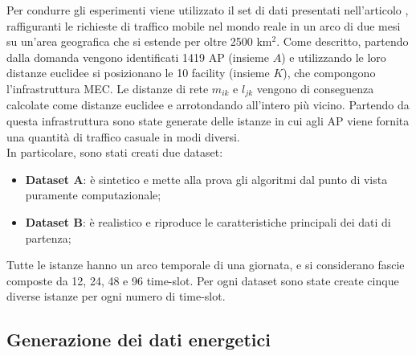 Per condurre gli esperimenti viene utilizzato il set di dati presentati nell'articolo \cite{assignment-patterns}, raffiguranti le richieste di traffico mobile nel mondo reale in un arco di due mesi su un'area geografica che si estende per oltre 2500 km$^2$. Come descritto, partendo dalla domanda vengono identificati 1419 AP (insieme $A$) e utilizzando le loro distanze euclidee si posizionano le 10 facility (insieme $K$), che compongono l'infrastruttura MEC. Le distanze di rete $m_{ik}$ e $l_{jk}$ vengono di conseguenza calcolate come distanze euclidee e arrotondando all'intero più vicino. Partendo da questa infrastruttura sono state generate delle istanze in cui agli AP viene fornita una quantità di traffico casuale in modi diversi.\\
In particolare, sono stati creati due dataset:
\begin{itemize}
    \item \textbf{Dataset A}: è sintetico e mette alla prova gli algoritmi dal punto di vista puramente computazionale;
    \item \textbf{Dataset B}: è realistico e riproduce le caratteristiche principali dei dati di partenza;
\end{itemize}
Tutte le istanze hanno un arco temporale di una giornata, e si considerano fascie composte da 12, 24, 48 e 96 time-slot. Per ogni dataset sono state create cinque diverse istanze per ogni numero di time-slot.


\subsection{Generazione dei dati energetici}

